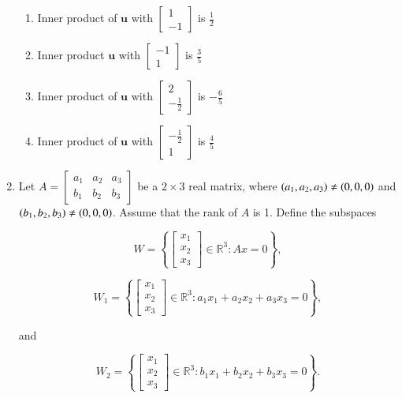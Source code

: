 \documentclass[journal]{IEEEtran}
\numberwithin{equation}{enumi}
\numberwithin{figure}{enumi}
\begin{document}
\begin{enumerate}
\begin{enumerate}[label=\brak{\Alph*}]
\item Inner product of $\mathbf{u}$ with $\begin{bmatrix} 1 \\ -1 \end{bmatrix}$ is $\frac{1}{2}$

\item Inner product $\mathbf{u}$ with $\begin{bmatrix} -1 \\ 1 \end{bmatrix}$ is $\frac{3}{5}$ 

\item Inner product of $\mathbf{u}$ with $\begin{bmatrix} 2 \\ -\frac{1}{2} \end{bmatrix}$ is $-\frac{6}{5}$

\item Inner product of $\mathbf{u}$ with $\begin{bmatrix} -\frac{1}{2} \\ 1 \end{bmatrix}$ is $\frac{4}{5}$
\end{enumerate}

\item Let $A = \begin{bmatrix} a_1 & a_2 & a_3 \\ b_1 & b_2 & b_3 \end{bmatrix}$ be a $2 \times 3$ real matrix, where $\left(a_1, a_2, a_3\right) \neq \left(0,0,0\right)$ and $\left(b_1, b_2, b_3\right) \neq \left(0,0,0\right)$. Assume that the rank of $A$ is 1. Define the subspaces 

$$W = \left\{ \begin{bmatrix} x_1 \\ x_2 \\ x_3 \end{bmatrix} \in \mathbb{R}^3 : Ax = 0 \right\},$$

$$W_1 = \left\{ \begin{bmatrix} x_1 \\ x_2 \\ x_3 \end{bmatrix} \in \mathbb{R}^3 : a_1x_1 + a_2x_2 + a_3x_3 = 0 \right\},$$

and

$$W_2 = \left\{ \begin{bmatrix} x_1 \\ x_2 \\ x_3 \end{bmatrix} \in \mathbb{R}^3 : b_1x_1 + b_2x_2 + b_3x_3 = 0 \right\}.$$


\end{enumerate}
\end{document}

